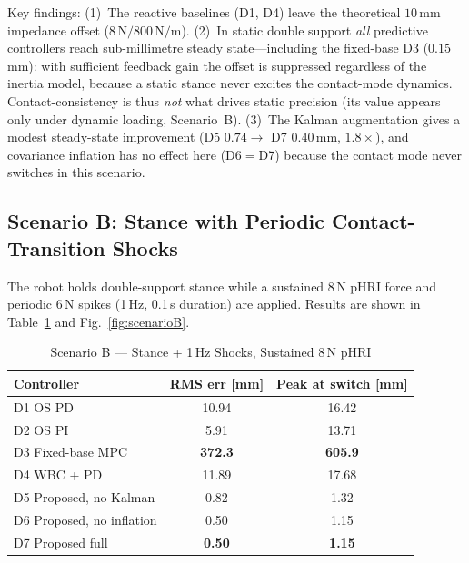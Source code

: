 Key findings: (1)~The reactive baselines (D1, D4) leave the theoretical
$10$\,mm impedance offset ($8\,\text{N}/800\,\text{N/m}$). (2)~In static
double support \emph{all} predictive controllers reach sub-millimetre steady
state---including the fixed-base D3 ($0.15$\,mm): with sufficient feedback
gain the offset is suppressed regardless of the inertia model, because a
static stance never excites the contact-mode dynamics. Contact-consistency is
thus \emph{not} what drives static precision (its value appears only under
dynamic loading, Scenario~B). (3)~The Kalman augmentation gives a modest
steady-state improvement (D5 $0.74\to$ D7 $0.40$\,mm, $1.8\times$), and
covariance inflation has no effect here (D6$=$D7) because the contact mode
never switches in this scenario.

\subsection{Scenario B: Stance with Periodic Contact-Transition Shocks}

The robot holds double-support stance while a sustained 8\,N pHRI force
and periodic 6\,N spikes (1\,Hz, 0.1\,s duration) are applied.
Results are shown in Table~\ref{tab:scenarioB} and Fig.~\ref{fig:scenarioB}.

\begin{table}[!t]
\caption{Scenario B --- Stance + 1\,Hz Shocks, Sustained 8\,N pHRI}
\label{tab:scenarioB}
\renewcommand{\arraystretch}{1.2}
\begin{tabular}{lcc}
\toprule
\textbf{Controller} & \textbf{RMS err [mm]} & \textbf{Peak at switch [mm]} \\
\midrule
D1 OS PD          & 10.94 & 16.42 \\
D2 OS PI          &  5.91 & 13.71 \\
D3 Fixed-base MPC   & \textbf{372.3} & \textbf{605.9} \\
D4 WBC + PD         & 11.89 & 17.68 \\
D5 Proposed, no Kalman &  0.82 &  1.32 \\
D6 Proposed, no inflation &  0.50 &  1.15 \\
D7 Proposed full    & \textbf{0.50} & \textbf{1.15} \\
\bottomrule
\end{tabular}
\end{table}

